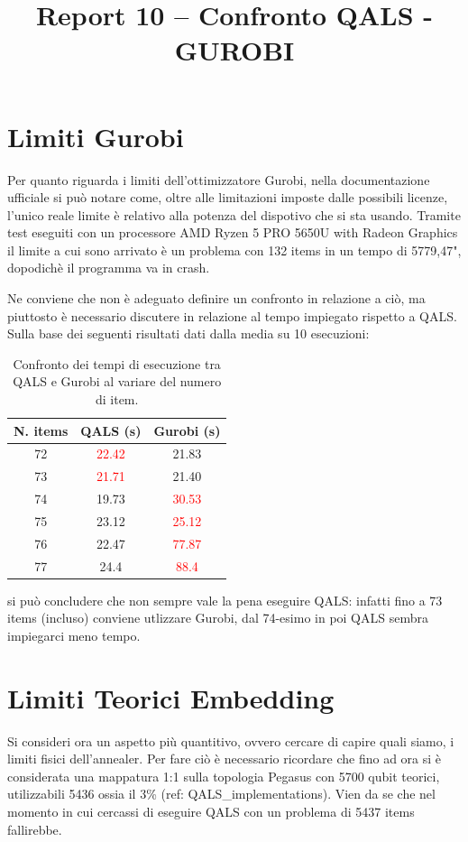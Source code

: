 \documentclass[12pt, letterpaper]{article}
\title{Report 10 -- Confronto QALS - GUROBI}
\begin{document}
\maketitle

\tableofcontents
\newpage

\section{Limiti Gurobi}
Per quanto riguarda i limiti dell'ottimizzatore Gurobi, nella documentazione 
ufficiale si può notare come, oltre alle limitazioni imposte dalle possibili licenze,
l'unico reale limite è relativo alla potenza del dispotivo che si sta usando. Tramite 
test eseguiti con un processore AMD Ryzen 5 PRO 5650U with Radeon Graphics il limite 
a cui sono arrivato è un problema con 132 items in un tempo di 5779,47", dopodichè il 
programma va in crash.

Ne conviene che non è adeguato definire un confronto in relazione a ciò, ma piuttosto
è necessario discutere in relazione al tempo impiegato rispetto a QALS.
Sulla base dei seguenti risultati dati dalla media su 10 esecuzioni:
\begin{table}[H]
    \centering
    \begin{tabular}{ccc}
        \toprule
        \textbf{N. items} & \textbf{QALS (s)} & \textbf{Gurobi (s)} \\
        \midrule
        72 & \textcolor{red}{22.42} & 21.83 \\
        73 & \textcolor{red}{21.71} & 21.40 \\
        74 & 19.73 & \textcolor{red}{30.53} \\
        75 & 23.12 & \textcolor{red}{25.12} \\
        76 & 22.47 & \textcolor{red}{77.87} \\
        77 & 24.4 &  \textcolor{red}{88.4} \\
        \bottomrule
    \end{tabular}
    \caption{Confronto dei tempi di esecuzione tra QALS e Gurobi al variare del numero di item.}
    \label{tab:qals_vs_gurobi}
\end{table}
si può concludere che non sempre vale la pena eseguire QALS: infatti fino a 73 items (incluso)
conviene utlizzare Gurobi, dal 74-esimo in poi QALS sembra impiegarci meno tempo.

\section{Limiti Teorici Embedding}
Si consideri ora un aspetto più quantitivo, ovvero cercare di capire quali siamo, 
i limiti fisici dell'annealer. Per fare ciò è necessario ricordare
che fino ad ora si è considerata una mappatura 1:1 sulla topologia Pegasus con 5700 qubit teorici,
utilizzabili 5436 ossia il 3\% (ref: QALS\_implementations). Vien da se che nel momento in cui 
cercassi di eseguire QALS con un problema di 5437 items fallirebbe. 
\end{document}
